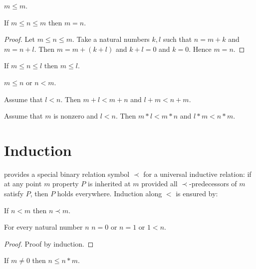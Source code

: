 \documentclass[11pt]{article}
\begin{document}
\begin{forthel}

\begin{lemma} $m \leq m$.
\end{lemma}

\begin{lemma} If $m \leq n \leq m$ 
then $m = n$.
\end{lemma}
\begin{proof}
Let $m \leq n \leq m$.
Take a natural numbers $k,l$ such that 
$n = m + k$ and $m = n + l$.
Then $m = m + (k + l)$ and $k + l = 0$ and $k = 0$.
Hence $m = n$.
\end{proof}

\begin{lemma} If $m \leq n \leq l$ 
then  $m \leq l$.
\end{lemma}

\begin{axiom} $m \leq n$ or $n < m$.
\end{axiom}

\begin{lemma} Assume that $l < n$.
  Then $m + l < m + n$ and $l + m < n + m$.
\end{lemma}

\begin{lemma} Assume that $m$ is nonzero and $l < n$.
  Then $m * l < m * n$ and $l * m < n * m$.
\end{lemma}

\end{forthel}

\section{Induction}

\Naproche{} provides a special binary relation
symbol $\prec$ for a universal inductive relation: if at any
point $m$ property $P$ is inherited at $m$ provided all
$\prec$-predecessors of $m$ satisfy $P$, then $P$ holds everywhere.
Induction along $<$ is ensured by:

\begin{forthel}
\begin{axiom} If $n < m$ then $n \prec m$.
\end{axiom}

\begin{lemma} For every natural number $n$ $n = 0$ or $n = 1$ or $1 < n$.
\end{lemma}
\begin{proof} Proof by induction.
\end{proof}

\begin{lemma} If $m \neq 0$ then $n \leq n * m$.
\end{lemma}

\end{forthel}
\end{document}

